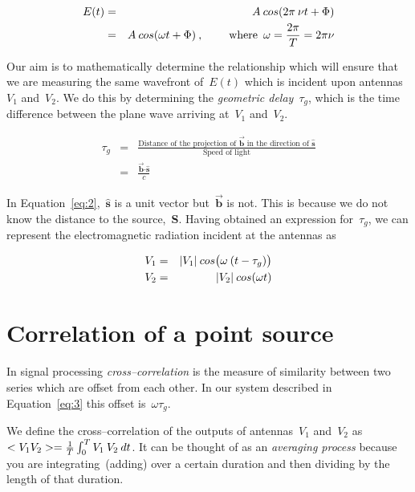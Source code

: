 \begin{eqnarray}
  \label{eq:1}
  E(t) &=& A \msp cos(2\pi \msp \nu t + \Phi) \nonumber \\
       &=& A \msp cos(\omega t + \Phi) \msp , \hspace{0.8cm} \mbox{where} \enspace \omega = \frac{2\pi}{T} = 2\pi \nu
\end{eqnarray}

Our aim is to mathematically determine the relationship which will ensure that we are measuring the same wavefront of~$E(t)$ which is incident upon antennas~$V_1$ and~$V_2$. We do this by determining the \emph{geometric delay}~$\tau _g$, which is the time difference between the plane wave arriving at~$V_1$ and~$V_2$.

\begin{eqnarray}
  \label{eq:2}
  \tau _g &=& \frac{\mbox{Distance of the projection of $\vec{\mathbf{b}}$ in the direction of $\mathbf{\hat{s}}$}}{\mbox{Speed of light}} \nonumber \\
          &=& \frac{\vec{\mathbf{b}} \boldsymbol{\cdot} \mathbf{\hat{s}}}{c}
\end{eqnarray}

In Equation~\eqref{eq:2},~$\mathbf{\hat{s}}$ is a unit vector but~$\vec{\mathbf{b}}$ is not. This is because we do not know the distance to the source,~\textbf{S}. Having obtained an expression for~$\tau _g$, we can represent the electromagnetic radiation incident at the antennas as

\begin{eqnarray}
  \label{eq:3}
  \begin{aligned}
  V_1 &=& |V_1| \msp cos\big (\omega \msp (t - \tau _g)\big ) \\
  V_2 &=& |V_2| \msp cos(\omega t)
  \end{aligned}
\end{eqnarray}

\section{Correlation of a point source}
In signal processing \emph{cross--correlation} is the measure of similarity between two series which are offset from each other. In our system described in Equation~\eqref{eq:3} this offset is~$\omega \tau _g$.

We define the cross--correlation of the outputs of antennas~$V_1$ and~$V_2$ as~$<V_1V_2> = \frac{1}{T} \int _0^T V_1 \msp V_2 \msp dt$. It can be thought of as an \emph{averaging process} because you are integrating~(adding) over a certain duration and then dividing by the length of that duration.

